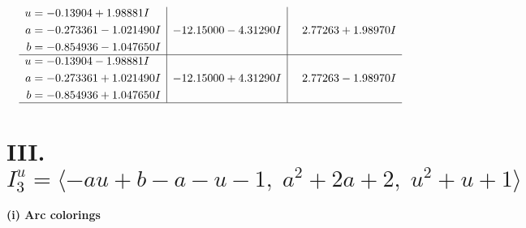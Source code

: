 \documentclass[1p]{elsarticle_modified}
\theoremstyle{definition}
\begin{document}
$$\begin{array}{c|c|c}
\begin{aligned}
u &= -0.13904 + 1.98881 I \\
a &= -0.273361 - 1.021490 I \\
b &= -0.854936 - 1.047650 I\end{aligned}
 & -12.15000 - 4.31290 I & \phantom{-}2.77263 + 1.98970 I \\ \hline\begin{aligned}
u &= -0.13904 - 1.98881 I \\
a &= -0.273361 + 1.021490 I \\
b &= -0.854936 + 1.047650 I\end{aligned}
 & -12.15000 + 4.31290 I & \phantom{-}2.77263 - 1.98970 I\\
 \hline 
 \end{array}$$\newpage\newpage\renewcommand{\arraystretch}{1}
\centering \section*{III. $I^u_{3}= \langle - a u+b- a- u-1,\;a^2+2 a+2,\;u^2+u+1 \rangle$}
\flushleft \textbf{(i) Arc colorings}\\
\end{document}
